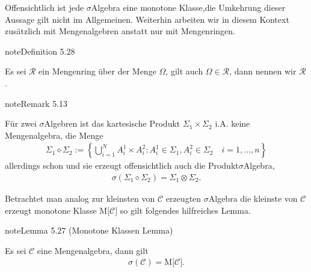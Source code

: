 \documentclass[letterpaper,10pt,german]{jupyterBook}
\begin{document}
\sphinxAtStartPar
Offensichtlich ist jede \(\sigma\)\sphinxhyphen{}Algebra eine monotone Klasse,die Umkehrung dieser Aussage gilt nicht im Allgemeinen.
Weiterhin arbeiten wir in diesem Kontext zusätzlich mit Mengenalgebren anstatt nur mit Mengenringen.
\label{masstheorie/integrationstechnik:definition-14}
\begin{sphinxadmonition}{note}{Definition 5.28}



\sphinxAtStartPar
Es sei \(\mathcal{R}\) ein Mengenring über der Menge \(\Omega\), gilt auch \(\Omega\in\mathcal{R}\), dann nennen wir \(\mathcal{R}\) .
\end{sphinxadmonition}
\label{masstheorie/integrationstechnik:remark-15}
\begin{sphinxadmonition}{note}{Remark 5.13}



\sphinxAtStartPar
Für zwei \(\sigma\)\sphinxhyphen{}Algebren ist das kartesische Produkt \(\Sigma_1\times\Sigma_2\) i.A. keine Mengenalgebra, die Menge
\begin{equation*}
\begin{split}\Sigma_1\diamond\Sigma_2:= \left\{\bigcup_{i=1}^N A^1_i\times A^2_i: A^1_i\in\Sigma_1, A^2_i\in\Sigma_2\quad i=1,\ldots,n\right\}\end{split}
\end{equation*}
\sphinxAtStartPar
allerdings schon und sie erzeugt offensichtlich auch die Produkt\sphinxhyphen{}\(\sigma\)\sphinxhyphen{}Algebra,
\begin{equation*}
\begin{split}\sigma(\Sigma_1\diamond\Sigma_2) = \Sigma_1\otimes\Sigma_2.\end{split}
\end{equation*}\end{sphinxadmonition}

\sphinxAtStartPar
Betrachtet man analog zur kleinsten von \(\mathcal{C}\) erzeugten \(\sigma\)\sphinxhyphen{}Algebra die kleinste von \(\mathcal{C}\) erzeugt monotone Klasse \(\text{M}\big[\mathcal{C}\big]\) so gilt folgendes hilfreiches Lemma.
\label{masstheorie/integrationstechnik:lem:monclass}
\begin{sphinxadmonition}{note}{Lemma 5.27 (Monotone Klassen Lemma)}



\sphinxAtStartPar
Es sei \(\mathcal{C}\) eine Mengenalgebra, dann gilt
\begin{equation*}
\begin{split}\sigma(\mathcal{C}) = \text{M}\big[\mathcal{C}\big].\end{split}
\end{equation*}\end{sphinxadmonition}
\end{document}
